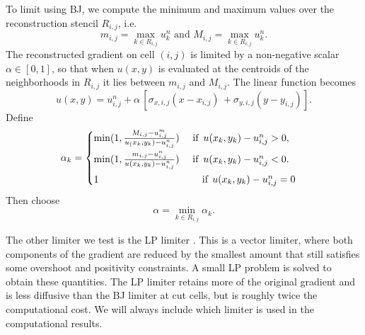 To limit using BJ, we compute the minimum and maximum values over the
reconstruction stencil $R_{i,j}$, i.e.
\begin{equation}
     m_{i,j} = \max_{k \in R_{i,j}} {u}_k^n \text{ and } 
     M_{i,j} = \max_{k \in R_{i,j}} {u}_k^n.
\label{eqn:bj}
\end{equation}
The reconstructed gradient on cell $(i,j)$ is limited by a non-negative 
scalar $\alpha \in [0,1]$, so that when ${u}(x,y)$ 
is evaluated at the centroids of the neighborhoods in $R_{i,j}$ it
lies between $m_{i,j}$ and $M_{i,j}$.
The linear function becomes 
\begin{equation}
     u(x,y) = {u}_{i,j}^n + \alpha \, [{\sigma}_{x,i,j} ( x -  x_{i,j}) \, 
   + {\sigma}_{y,i,j}( y -  y_{i,j})].
\end{equation}
Define
\begin{equation}
    \alpha_k = \begin{cases}
           \min (1,\frac{M_{i,j}-u_{i,j}^m}{u_(x_k,y_k) - u_{i,j}^n})
    \quad  \text{ if } \,  {u}( x_{k},  y_{k}) - {u}_{i,j}^n >  0,\\[.08in]
            \min(1, \frac{m_{i,j}-{u}_{i,j}^n}{u(x_k,y_k) - {u}_{i,j}^n} )  
    \quad  \text{ if }  \, {u}(x_{k}, y_{k}) - {u}_{i,j}^n < 0.\\[.08in]
             1    \hspace*{1.45in}  \text{if} \; \, {u}(x_{k}, y_{k}) - {u}_{i,j}^n = 0
    \end{cases}
\end{equation}
Then choose
$$
\alpha = \min_{k \in R_{i,j}} \alpha_k .
$$

The other limiter we test is the LP limiter 
\cite{May_Berger_LP}. This is a vector limiter, where both components of
the gradient are reduced by the smallest amount that still satisfies some
overshoot and positivity constraints. A small LP problem is solved to 
obtain these quantities.
The LP limiter retains more of the original gradient
and is less diffusive than the BJ limiter at cut cells, 
but is roughly twice the computational cost.
We will always include which limiter is used
in the computational results.  

